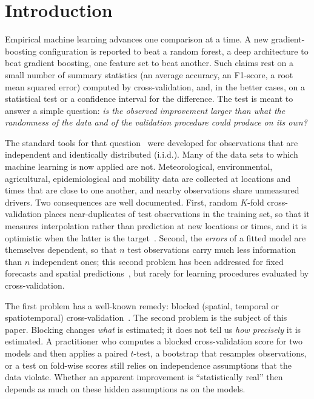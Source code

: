 \section{Introduction}\label{sec:intro}

Empirical machine learning advances one comparison at a time. A new gradient-boosting configuration is reported to beat a random forest, a deep architecture to beat gradient boosting, one feature set to beat another. Such claims rest on a small number of summary statistics (an average accuracy, an F1-score, a root mean squared error) computed by cross-validation, and, in the better cases, on a statistical test or a confidence interval for the difference. The test is meant to answer a simple question: \emph{is the observed improvement larger than what the randomness of the data and of the validation procedure could produce on its own?}

The standard tools for that question~\cite{dietterich1998,nadeau2003,demsar2006,benavoli2017} were developed for observations that are independent and identically distributed (i.i.d.). Many of the data sets to which machine learning is now applied are not. Meteorological, environmental, agricultural, epidemiological and mobility data are collected at locations and times that are close to one another, and nearby observations share unmeasured drivers. Two consequences are well documented. First, random $K$-fold cross-validation places near-duplicates of test observations in the training set, so that it measures interpolation rather than prediction at new locations or times, and it is optimistic when the latter is the target~\cite{roberts2017,ploton2020,meyer2018,bergmeir2012}. Second, the \emph{errors} of a fitted model are themselves dependent, so that $n$ test observations carry much less information than $n$ independent ones; this second problem has been addressed for fixed forecasts and spatial predictions~\cite{diebold1995,hering2011}, but rarely for learning procedures evaluated by cross-validation.

The first problem has a well-known remedy: blocked (spatial, temporal or spatiotemporal) cross-validation~\cite{roberts2017,valavi2019,linnenbrink2024}. The second problem is the subject of this paper. Blocking changes \emph{what} is estimated; it does not tell us \emph{how precisely} it is estimated. A practitioner who computes a blocked cross-validation score for two models and then applies a paired $t$-test, a bootstrap that resamples observations, or a test on fold-wise scores still relies on independence assumptions that the data violate. Whether an apparent improvement is ``statistically real'' then depends as much on these hidden assumptions as on the models.

